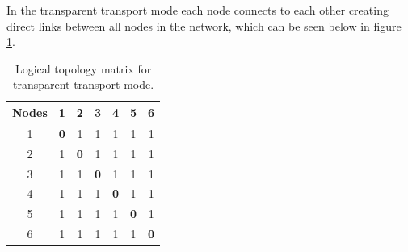In the transparent transport mode each node connects to each other creating direct links between all nodes in the network, which can be seen below in figure \ref{Transparentlogical_topology}.
\begin{table}[H]
	\centering	
	\begin{tabular}{|c|c|c|c|c|c|c|}
		\hline
		\multicolumn{1}{|l|}{\textbf{Nodes}} & 1   & 2   & 3   & 4   & 5   & 6  \\ \hline
		1                           & \textbf{0}   & 1 & 1 & 1 & 1 & 1 \\ \hline
		2                           & 1 & \textbf{0}   & 1 & 1 & 1 & 1 \\ \hline
		3                           & 1 & 1 & \textbf{0}   & 1 & 1 & 1 \\ \hline
		4                           & 1 & 1 & 1 & \textbf{0}   & 1 & 1 \\ \hline
		5                           & 1 & 1 & 1 & 1 & \textbf{0}   & 1 \\ \hline
		6                           & 1 & 1 & 1 & 1 & 1 & \textbf{0}   \\ \hline
	\end{tabular}
	\caption{Logical topology matrix for transparent transport mode.}
	\label{Transparentlogical_topology}
\end{table}


